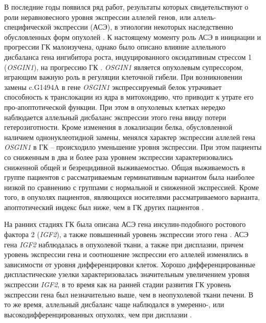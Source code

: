 В последние годы появился ряд работ, результаты которых свидетельствуют о роли неравновесного уровня экспрессии аллелей генов, или аллель-специфической экспрессии (АСЭ), в этиологии некоторых наследственно обусловленных форм опухолей \cite{galiatsatos_familial_2006, chan_heritable_2006, buzby_allele-specific_2017}. К настоящему моменту роль АСЭ в инициации и прогрессии ГК малоизучена, однако было описано влияние аллельного дисбаланса гена ингибитора роста, индуцированного оксидативным стрессом 1 (\textit{OSGIN1}), на прогрессию ГК \cite{liu_allele-specific_2014}. \textit{OSGIN1} является опухолевым супрессором, играющим важную роль в регуляции клеточной гибели. При возникновении замены c.G1494A в гене \textit{OSGIN1} экспрессируемый белок утрачивает способность к транслокации из ядра в митохондрию, что приводит к утрате его про-апоптотической функции. При этом в опухолевых клетках нередко наблюдается аллельный дисбаланс экспрессии этого гена ввиду потери гетерозиготности. Кроме изменения в локализации белка, обусловленной наличием однонуклеотидной замены, менялся характер экспрессии аллелей гена \textit{OSGIN1} в ГК – происходило уменьшение уровня экспрессии. При этом пациенты со сниженным в два и более раза уровнем экспрессии характеризовались сниженной общей и безрецидивной выживаемостью. Общая выживаемость в группе пациентов с рассматриваемым герминативным вариантом была наиболее низкой по сравнению с группами с нормальной и сниженной экспрессией. Кроме того, в опухолях пациентов, являющихся носителями рассматриваемого варианта, апоптотический индекс был ниже, чем в ГК других пациентов \cite{liu_allele-specific_2014}.

На ранних стадиях ГК была описана АСЭ гена инсулин-подобного ростового фактора 2 (\textit{IGF2}), а также повышенный уровень экспрессии этого гена \cite{takeda_allelic-expression_1996}. АСЭ гена \textit{IGF2} наблюдалась в опухолевой ткани, а также при дисплазии, причем уровень экспрессии гена и соотношение экспрессии его аллелей изменялись в зависимости от уровня дифференцировки клеток. Хорошо дифференцированные диспластические узелки характеризовалась значительным увеличением уровня экспрессии \textit{IGF2}, в то время как на ранней стадии развития ГК уровень экспрессии гена был незначительно выше, чем в неопухолевой ткани печени. В то же время, аллельный дисбаланс чаще наблюдался в умеренно-,  или высокодифференцированных опухолях, чем при дисплазии \cite{aihara_allelic_1998}.
 
